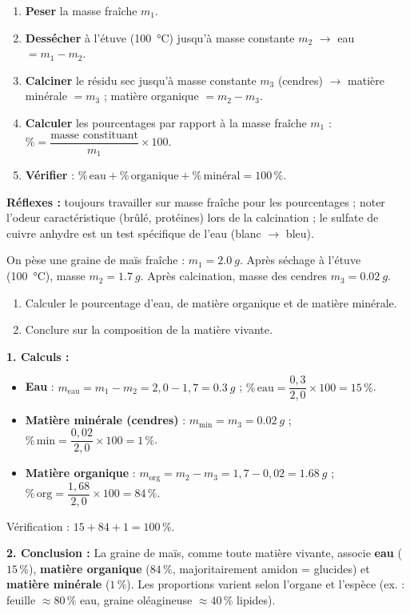 \documentclass[11pt]{article}
\begin{document}
\begin{methode}
\begin{enumerate}
\item \textbf{Peser} la masse fraîche $m_1$.
\item \textbf{Dessécher} à l'étuve (\SI{100}{\celsius}) jusqu'à masse constante $m_2$ $\rightarrow$ eau $= m_1 - m_2$.
\item \textbf{Calciner} le résidu sec jusqu'à masse constante $m_3$ (cendres) $\rightarrow$ matière minérale $= m_3$ ; matière organique $= m_2 - m_3$.
\item \textbf{Calculer} les pourcentages par rapport à la masse fraîche $m_1$ : $\% = \dfrac{\text{masse constituant}}{m_1} \times 100$.
\item \textbf{Vérifier} : $\%\,\text{eau} + \%\,\text{organique} + \%\,\text{minéral} = 100\,\%$.
\end{enumerate}
\textbf{Réflexes :} toujours travailler sur masse fraîche pour les pourcentages ; noter l'odeur caractéristique (brûlé, protéines) lors de la calcination ; le sulfate de cuivre anhydre est un test spécifique de l'eau (blanc $\rightarrow$ bleu).
\end{methode}

\begin{exoresolu}
On pèse une graine de maïs fraîche : $m_1 = \SI{2,0}{g}$. Après séchage à l'étuve (\SI{100}{\celsius}), masse $m_2 = \SI{1,7}{g}$. Après calcination, masse des cendres $m_3 = \SI{0,02}{g}$.
\begin{enumerate}
\item Calculer le pourcentage d'eau, de matière organique et de matière minérale.
\item Conclure sur la composition de la matière vivante.
\end{enumerate}
\tcblower
\textbf{1. Calculs :}
\begin{itemize}
\item \textbf{Eau} : $m_{\text{eau}} = m_1 - m_2 = 2,0 - 1,7 = \SI{0,3}{g}$ ; $\%\,\text{eau} = \dfrac{0,3}{2,0} \times 100 = 15\,\%$.
\item \textbf{Matière minérale (cendres)} : $m_{\text{min}} = m_3 = \SI{0,02}{g}$ ; $\%\,\text{min} = \dfrac{0,02}{2,0} \times 100 = 1\,\%$.
\item \textbf{Matière organique} : $m_{\text{org}} = m_2 - m_3 = 1,7 - 0,02 = \SI{1,68}{g}$ ; $\%\,\text{org} = \dfrac{1,68}{2,0} \times 100 = 84\,\%$.
\end{itemize}
Vérification : $15 + 84 + 1 = 100\,\%$.

\textbf{2. Conclusion :} La graine de maïs, comme toute matière vivante, associe \textbf{eau} ($15\,\%$), \textbf{matière organique} ($84\,\%$, majoritairement amidon = glucides) et \textbf{matière minérale} ($1\,\%$). Les proportions varient selon l'organe et l'espèce (ex. : feuille $\approx 80\,\%$ eau, graine oléagineuse $\approx 40\,\%$ lipides).
\end{exoresolu}
\end{document}
